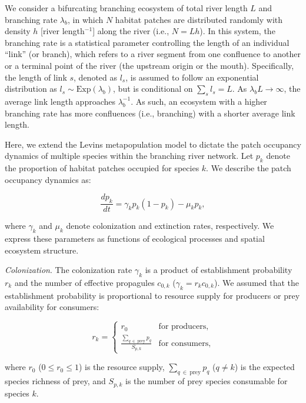 \documentclass[11pt, class=article, crop=false]{standalone}
\begin{document}
We consider a bifurcating branching ecosystem of total river length $L$ and branching rate $\lambda_b$, in which $N$ habitat patches are distributed randomly with density $h$ [river length$^{-1}$] along the river (i.e., $N = Lh$).
In this system, the branching rate is a statistical parameter controlling the length of an individual ``link'' (or branch), which refers to a river segment from one confluence to another or a terminal point of the river (the upstream origin or the mouth).
Specifically, the length of link $s$, denoted as $l_s$, is assumed to follow an exponential distribution as $l_s \sim \mbox{Exp}(\lambda_b)$, but is conditional on $\sum_s l_s = L$.
As $\lambda_b L \rightarrow \infty$, the average link length approaches $\lambda_b^{-1}$.
As such, an ecosystem with a higher branching rate has more confluences (i.e., branching) with a shorter average link length.

Here, we extend the Levins metapopulation model to dictate the patch occupancy dynamics of multiple species within the branching river network.
Let $p_k$ denote the proportion of habitat patches occupied for species $k$.
We describe the patch occupancy dynamics as:

\begin{equation}
    \frac{dp_k}{dt} = \gamma_{k} p_k (1 - p_k) - \mu_k p_k,
\end{equation}

where $\gamma_k$ and $\mu_k$ denote colonization and extinction rates, respectively.
We express these parameters as functions of ecological processes and spatial ecosystem structure.

\textit{Colonization}. The colonization rate $\gamma_k$ is a product of establishment probability $r_k$ and the number of effective propagules $c_{0,k}$ ($\gamma_k = r_k c_{0,k}$).
We assumed that the establishment probability is proportional to resource supply for producers or prey availability for consumers:

\begin{equation}
    r_{k} = 
    \begin{cases}
        r_0 & \text{for producers,}\\
        \frac{\sum_{q~\in~\text{prey}} p_{q}}{S_{p,k}} & \text{for consumers,}
    \end{cases}
\end{equation}

where $r_0$ ($0 \le r_0 \le 1$) is the resource supply, $\sum_{q~\in~\text{prey}} p_{q}$ ($q \ne k$) is the expected species richness of prey, and $S_{p,k}$ is the number of prey species consumable for species $k$.
\end{document}
